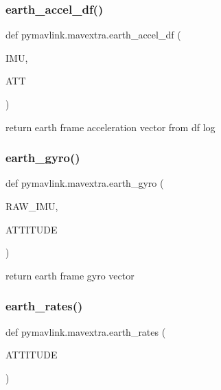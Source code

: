 \subsubsection{\texorpdfstring{earth\+\_\+accel\+\_\+df()}{earth\_accel\_df()}}
{\footnotesize\ttfamily def pymavlink.\+mavextra.\+earth\+\_\+accel\+\_\+df (\begin{DoxyParamCaption}\item[{}]{I\+MU,  }\item[{}]{A\+TT }\end{DoxyParamCaption})}

\begin{DoxyVerb}return earth frame acceleration vector from df log\end{DoxyVerb}
 \mbox{\label{namespacepymavlink_1_1mavextra_ad31722417bd0b051505d2a9f7e70183a}} 
\subsubsection{\texorpdfstring{earth\+\_\+gyro()}{earth\_gyro()}}
{\footnotesize\ttfamily def pymavlink.\+mavextra.\+earth\+\_\+gyro (\begin{DoxyParamCaption}\item[{}]{R\+A\+W\+\_\+\+I\+MU,  }\item[{}]{A\+T\+T\+I\+T\+U\+DE }\end{DoxyParamCaption})}

\begin{DoxyVerb}return earth frame gyro vector\end{DoxyVerb}
 \mbox{\label{namespacepymavlink_1_1mavextra_ada9a5936b18dd8a99085b06b9b687573}} 
\subsubsection{\texorpdfstring{earth\+\_\+rates()}{earth\_rates()}}
{\footnotesize\ttfamily def pymavlink.\+mavextra.\+earth\+\_\+rates (\begin{DoxyParamCaption}\item[{}]{A\+T\+T\+I\+T\+U\+DE }\end{DoxyParamCaption})}

